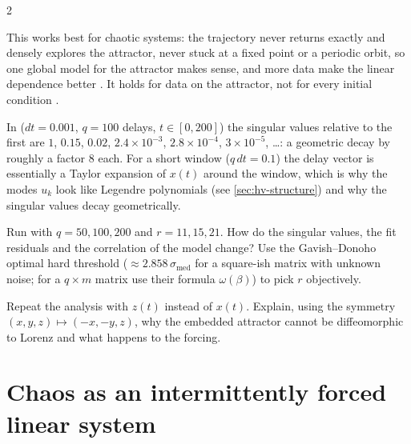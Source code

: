 \begin{paracol}{2}
\begin{remark}
This works best for chaotic systems: the trajectory never returns exactly and densely explores the attractor, never stuck at
a fixed point or a periodic orbit, so one global model for the attractor makes sense, and more data make the linear dependence
better . It holds for data on the attractor, not for every initial condition
.
\end{remark}

\begin{secondary}
In  ($dt=0.001$, $q=100$ delays, $t\in[0,200]$) the singular values relative to the first are $1$,
$0.15$, $0.02$, $2.4\times10^{-3}$, $2.8\times10^{-4}$, $3\times10^{-5}$, \dots: a geometric decay by roughly a factor 8 each.
For a short window ($q\,dt=0.1$) the delay vector is essentially a Taylor expansion of $x(t)$ around the window, which is why
the modes $u_k$ look like Legendre polynomials (see \cref{sec:hv-structure}) and why the singular values decay geometrically.
\end{secondary}

\begin{exercise}
Run  with $q=50,100,200$ and $r=11,15,21$. How do the singular values, the fit residuals and the correlation of
the model change? Use the Gavish--Donoho optimal hard threshold ($\approx2.858\,\sigma_{\text{med}}$ for a square-ish matrix with
unknown noise; for a $q\times m$ matrix use their formula $\omega(\beta)$) to pick $r$ objectively.
\end{exercise}

\begin{exercise}
Repeat the analysis with $z(t)$ instead of $x(t)$. Explain, using the symmetry $(x,y,z)\mapsto(-x,-y,z)$, why the embedded attractor
cannot be diffeomorphic to Lorenz and what happens to the forcing.
\end{exercise}

\section{Chaos as an intermittently forced linear system}\label{sec:hv-model}


\end{paracol}
